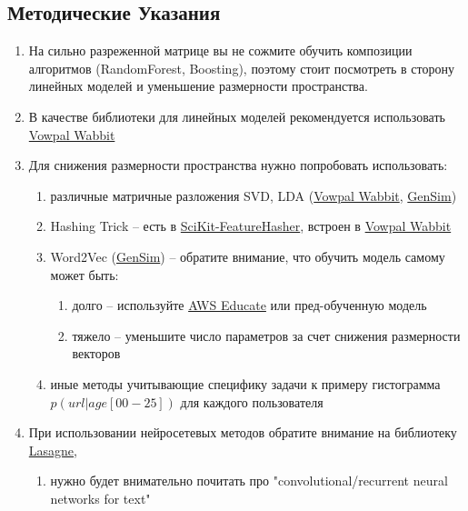 \documentclass[a4paper, 12pt]{article}
\begin{document}
\subsection*{Методические Указания}
  \begin{enumerate}
      \item На сильно разреженной матрице вы не сожмите обучить композиции алгоритмов (RandomForest, Boosting), поэтому стоит посмотреть в сторону линейных моделей и уменьшение размерности пространства. 
      \item В качестве библиотеки для линейных моделей рекомендуется использовать \href{https://github.com/JohnLangford/vowpal_wabbit/wiki}{Vowpal Wabbit}
      \item Для снижения размерности пространства нужно попробовать использовать:
      	\begin{enumerate}
			\item различные матричные разложения SVD, LDA (\href{https://github.com/JohnLangford/vowpal_wabbit/wiki}{Vowpal Wabbit}, \href{https://radimrehurek.com/gensim/}{GenSim})
            \item Hashing Trick -- есть в \href{http://scikit-learn.org/stable/modules/generated/sklearn.feature_extraction.FeatureHasher.html}{SciKit-FeatureHasher}, встроен в \href{https://github.com/JohnLangford/vowpal_wabbit/wiki}{Vowpal Wabbit}
            \item Word2Vec (\href{https://radimrehurek.com/gensim/}{GenSim}) -- обратите внимание, что обучить модель самому может быть:
            \begin{enumerate}
				\item долго -- используйте \href{https://aws.amazon.com/ru/education/awseducate/}{AWS Educate} или пред-обученную модель
               \item тяжело -- уменьшите число параметров за счет снижения размерности векторов
			\end{enumerate}
			\item иные методы учитывающие специфику задачи к примеру гистограмма $p(url | age[00-25])$ для каждого пользователя
        \end{enumerate}
       \item При использовании нейросетевых методов обратите внимание на библиотеку \href{http://lasagne.readthedocs.org/en/latest/index.html}{Lasagne}, 
       \begin{enumerate}
			\item нужно будет внимательно почитать про "convolutional/recurrent neural networks for text"

\end{enumerate}
\end{enumerate}
\end{document}
